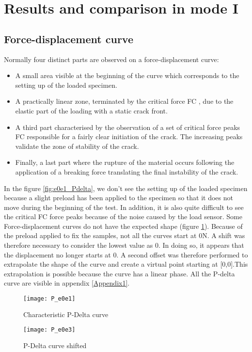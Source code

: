 \section{Results and comparison in mode I}

\subsection{Force-displacement curve}

Normally four distinct parts are observed on a force-displacement curve:

\begin{itemize}
	\item A small area visible at the beginning of the curve which corresponds to the setting up of the loaded specimen. 
	\item A practically linear zone, terminated by the critical force FC , due to the elastic part of the loading with a static crack front.
	\item A third part characterised by the observation of a set of critical force peaks FC responsible for a fairly clear initiation of the crack. The increasing peaks validate the zone of stability of the crack.
	\item Finally, a last part where the rupture of the material occurs following the application of a breaking force translating the final instability of the crack.
\end{itemize}

 In the figure \ref{fig:e0e1_Pdelta}, we don't see the setting up of the loaded specimen because a slight preload has been applied to the specimen so that it does not move during the beginning of the test. In addition, it is also quite difficult to see the critical FC force peaks because of the noise caused by the load sensor.
 Some Force-displacement curves do not have the expected shape (figure \ref{fig:e0e5_Pdelta}). Because of the preload applied to fix the samples, not all the curves start at 0N. A shift was therefore necessary to consider the lowest value as 0. In doing so, it appears that the displacement no longer starts at 0. A second offset was therefore performed to extrapolate the shape of the curve and create a virtual point starting at [0,0].This extrapolation is possible because the curve has a linear phase. All the P-delta curve are visible in appendix \ref{Appendix1}.


\begin{figure}[htp]
	\begin{minipage}[c]{.46\linewidth}
		\centering
		\texttt{[image: P\_e0e1]}
		\caption{Characteristic P-Delta curve}
		\label{fig:e0e1_Pdelta}
	\end{minipage}
	\hfill%
	\begin{minipage}[c]{.46\linewidth}
		\centering
		\texttt{[image: P\_e0e3]}
		\caption{P-Delta curve shifted}
		\label{fig:e0e5_Pdelta}
	\end{minipage}
\end{figure}


